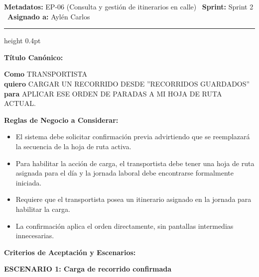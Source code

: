 \documentclass[a4paper,9pt]{article}
\begin{document}
\begin{tcolorbox}[hucard, title={\textbf{HU-64: CARGAR RECORRIDO} \hfill \scriptsize \colorbox{tealstatus}{\textbf{\ Accepted\ }} \quad \colorbox{white}{\textcolor{primarydark}{\textbf{\ 3 pts\ }}}}]
\vspace{-1pt}
\noindent\textbf{\footnotesize Metadatos:} EP-06 (Consulta y gestión de itinerarios en calle) \textbar\ \textbf{Sprint:} Sprint 2 \textbar\ \textbf{Asignado a:} Aylén Carlos\par\vspace{2pt}
\hrule height 0.4pt\par\vspace{3pt}
\noindent\textbf{\footnotesize Título Canónico:}\par\vspace{1pt}
{\small \textbf{Como} TRANSPORTISTA \\ \textbf{quiero} CARGAR UN RECORRIDO DESDE ''RECORRIDOS GUARDADOS'' \\ \textbf{para} APLICAR ESE ORDEN DE PARADAS A MI HOJA DE RUTA ACTUAL.}\par\vspace{3pt}
\noindent\textbf{\footnotesize Reglas de Negocio a Considerar:}\par\vspace{1pt}
{\footnotesize
\begin{itemize}[leftmargin=12pt, nosep, itemsep=1.5pt, topsep=1pt]
\item El sistema debe solicitar confirmación previa advirtiendo que se reemplazará la secuencia de la hoja de ruta activa.
\item Para habilitar la acción de carga, el transportista debe tener una hoja de ruta asignada para el día y la jornada laboral debe encontrarse formalmente iniciada.
\item Requiere que el transportista posea un itinerario asignado en la jornada para habilitar la carga.
\item La confirmación aplica el orden directamente, sin pantallas intermedias innecesarias.
\end{itemize}
}\par\vspace{3pt}
\noindent\textbf{\footnotesize Criterios de Aceptación y Escenarios:}\par\vspace{2pt}
{\footnotesize
\noindent\textbf{\textcolor{secondarydark}{ESCENARIO 1:  Carga de recorrido confirmada}}\par\vspace{1pt}
}
\end{tcolorbox}
\end{document}
